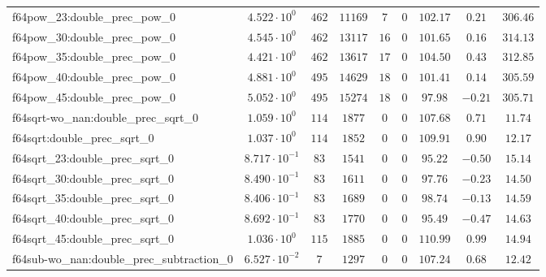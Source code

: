 \begin{tabular}{|l|c|c|c|c|c|c|c|c|}
f64pow\_23:double\_prec\_pow\_0                & $ 4.522 \cdot 10^{0}  $ & $ 462    $ & $ 11169  $ & $ 7   $ & $ 0   $ & $ 102.17      $ & $ 0.21    $ & $ 306.46  $ \\
f64pow\_30:double\_prec\_pow\_0                & $ 4.545 \cdot 10^{0}  $ & $ 462    $ & $ 13117  $ & $ 16  $ & $ 0   $ & $ 101.65      $ & $ 0.16    $ & $ 314.13  $ \\
f64pow\_35:double\_prec\_pow\_0                & $ 4.421 \cdot 10^{0}  $ & $ 462    $ & $ 13617  $ & $ 17  $ & $ 0   $ & $ 104.50      $ & $ 0.43    $ & $ 312.85  $ \\
f64pow\_40:double\_prec\_pow\_0                & $ 4.881 \cdot 10^{0}  $ & $ 495    $ & $ 14629  $ & $ 18  $ & $ 0   $ & $ 101.41      $ & $ 0.14    $ & $ 305.59  $ \\
f64pow\_45:double\_prec\_pow\_0                & $ 5.052 \cdot 10^{0}  $ & $ 495    $ & $ 15274  $ & $ 18  $ & $ 0   $ & $ 97.98       $ & $ -0.21   $ & $ 305.71  $ \\
f64sqrt-wo\_nan:double\_prec\_sqrt\_0          & $ 1.059 \cdot 10^{0}  $ & $ 114    $ & $ 1877   $ & $ 0   $ & $ 0   $ & $ 107.68      $ & $ 0.71    $ & $ 11.74   $ \\
f64sqrt:double\_prec\_sqrt\_0                  & $ 1.037 \cdot 10^{0}  $ & $ 114    $ & $ 1852   $ & $ 0   $ & $ 0   $ & $ 109.91      $ & $ 0.90    $ & $ 12.17   $ \\
f64sqrt\_23:double\_prec\_sqrt\_0              & $ 8.717 \cdot 10^{-1} $ & $ 83     $ & $ 1541   $ & $ 0   $ & $ 0   $ & $ 95.22       $ & $ -0.50   $ & $ 15.14   $ \\
f64sqrt\_30:double\_prec\_sqrt\_0              & $ 8.490 \cdot 10^{-1} $ & $ 83     $ & $ 1611   $ & $ 0   $ & $ 0   $ & $ 97.76       $ & $ -0.23   $ & $ 14.50   $ \\
f64sqrt\_35:double\_prec\_sqrt\_0              & $ 8.406 \cdot 10^{-1} $ & $ 83     $ & $ 1689   $ & $ 0   $ & $ 0   $ & $ 98.74       $ & $ -0.13   $ & $ 14.59   $ \\
f64sqrt\_40:double\_prec\_sqrt\_0              & $ 8.692 \cdot 10^{-1} $ & $ 83     $ & $ 1770   $ & $ 0   $ & $ 0   $ & $ 95.49       $ & $ -0.47   $ & $ 14.63   $ \\
f64sqrt\_45:double\_prec\_sqrt\_0              & $ 1.036 \cdot 10^{0}  $ & $ 115    $ & $ 1885   $ & $ 0   $ & $ 0   $ & $ 110.99      $ & $ 0.99    $ & $ 14.94   $ \\
f64sub-wo\_nan:double\_prec\_subtraction\_0    & $ 6.527 \cdot 10^{-2} $ & $ 7      $ & $ 1297   $ & $ 0   $ & $ 0   $ & $ 107.24      $ & $ 0.68    $ & $ 12.42   $ \\

\end{tabular}
